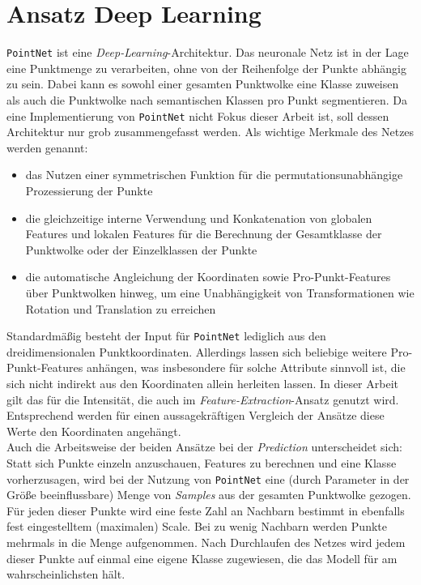 
\chapter{Ansatz Deep Learning}
\label{chap:deepl}

\texttt{PointNet} \citep{Charles.etal-2017} ist eine \textit{Deep-Learning}-Architektur. Das neuronale Netz ist in der Lage eine Punktmenge zu verarbeiten, ohne von der Reihenfolge der Punkte abhängig zu sein. Dabei kann es sowohl einer gesamten Punktwolke eine Klasse zuweisen als auch die Punktwolke nach semantischen Klassen pro Punkt segmentieren. Da eine Implementierung von \texttt{PointNet} nicht Fokus dieser Arbeit ist, soll dessen Architektur nur grob zusammengefasst werden. Als wichtige Merkmale des Netzes werden genannt: 
\begin{itemize}
    \item das Nutzen einer symmetrischen Funktion für die permutationsunabhängige Prozessierung der Punkte
    \item die gleichzeitige interne Verwendung und Konkatenation von globalen Features und lokalen Features für die Berechnung der Gesamtklasse der Punktwolke oder der Einzelklassen der Punkte
    \item die automatische Angleichung der Koordinaten sowie Pro-Punkt-Features über Punktwolken hinweg, um eine Unabhängigkeit von Transformationen wie Rotation und Translation zu erreichen
\end{itemize}
Standardmäßig besteht der Input für \texttt{PointNet} lediglich aus den dreidimensionalen Punktkoordinaten. Allerdings lassen sich beliebige weitere Pro-Punkt-Features anhängen, was insbesondere für solche Attribute sinnvoll ist, die sich nicht indirekt aus den Koordinaten allein herleiten lassen. In dieser Arbeit gilt das für die Intensität, die auch im \textit{Feature-Extraction}-Ansatz genutzt wird. Entsprechend werden für einen aussagekräftigen Vergleich der Ansätze diese Werte den Koordinaten angehängt. \\
Auch die Arbeitsweise der beiden Ansätze bei der \textit{Prediction} unterscheidet sich: Statt sich Punkte einzeln anzuschauen, Features zu berechnen und eine Klasse vorherzusagen, wird bei der Nutzung von \texttt{PointNet} eine (durch Parameter in der Größe beeinflussbare) Menge von \textit{Samples} aus der gesamten Punktwolke gezogen. Für jeden dieser Punkte wird eine feste Zahl an Nachbarn bestimmt in ebenfalls fest eingestelltem (maximalen) Scale. Bei zu wenig Nachbarn werden Punkte mehrmals in die Menge aufgenommen. Nach Durchlaufen des Netzes wird jedem dieser Punkte auf einmal eine eigene Klasse zugewiesen, die das Modell für am wahrscheinlichsten hält. \\
